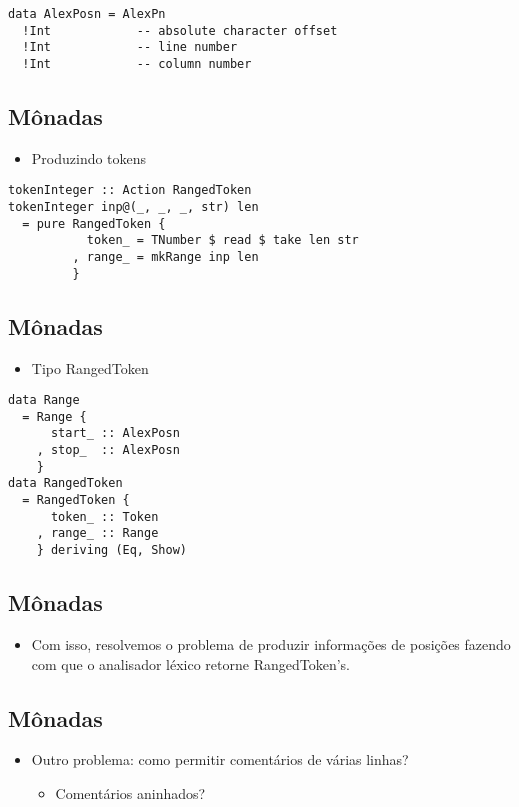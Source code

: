\documentclass[11pt]{article}
\begin{document}
\begin{verbatim}
data AlexPosn = AlexPn
  !Int            -- absolute character offset
  !Int            -- line number
  !Int            -- column number
\end{verbatim}
\subsection*{Mônadas}
\label{sec:org7ec5941}

\begin{itemize}
\item Produzindo tokens
\end{itemize}

\begin{verbatim}
tokenInteger :: Action RangedToken
tokenInteger inp@(_, _, _, str) len
  = pure RangedToken {
           token_ = TNumber $ read $ take len str
         , range_ = mkRange inp len
         }
\end{verbatim}
\subsection*{Mônadas}
\label{sec:org6c29206}

\begin{itemize}
\item Tipo RangedToken
\end{itemize}

\begin{verbatim}
data Range
  = Range {
      start_ :: AlexPosn
    , stop_  :: AlexPosn
    }
data RangedToken
  = RangedToken {
      token_ :: Token
    , range_ :: Range
    } deriving (Eq, Show)
\end{verbatim}
\subsection*{Mônadas}
\label{sec:orgef797c6}

\begin{itemize}
\item Com isso, resolvemos o problema de produzir informações de posições fazendo com que o analisador léxico retorne RangedToken's.
\end{itemize}
\subsection*{Mônadas}
\label{sec:org5de3709}

\begin{itemize}
\item Outro problema: como permitir comentários de várias linhas?
\begin{itemize}
\item Comentários aninhados?
\end{itemize}
\end{itemize}
\end{document}
